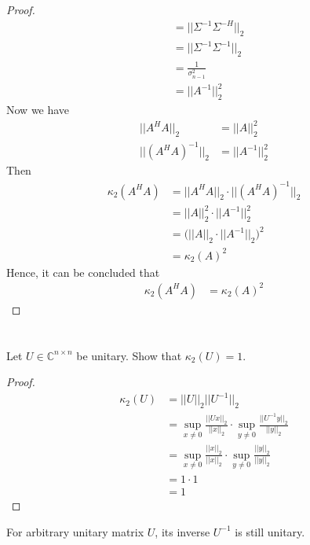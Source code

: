\documentclass[11pt,a4paper]{article}
\begin{document}
\begin{proof}
\begin{align}
     &=  || \Sigma^{-1} \Sigma^{-H} ||_2 \\
     &=  || \Sigma^{-1} \Sigma^{-1} ||_2 \\
     &=  \frac{1}{\sigma_{n-1}^2} \\
     &= || A^{-1} ||_2^2
    \end{align}   
    Now we have 
    \begin{align}
        || A^H A ||_2 &= || A ||_2^2 \\
     || (A^H A)^{-1} ||_2 &= || A^{-1} ||_2^2
    \end{align}
    Then
    \begin{align}
        \kappa_2 (A^H A) &= || A^H A ||_2 \cdot || (A^H A)^{-1} ||_2  \\
        & = || A ||_2^2 \cdot || A^{-1} ||_2^2 \\
        & = \big( || A ||_2 \cdot || A^{-1} ||_2 \big)^2 \\
        & = \kappa_2(A)^2
    \end{align}
    Hence, it can be concluded that 
    \begin{align}
        \kappa_2 (A^H A) & = \kappa_2(A)^2
    \end{align}
\end{proof}

\newpage
\section{}

\newpage
\section{}

Let $U \in \mathbb{C}^{n\times n}$ be unitary. Show that $\kappa_2(U) = 1$.
\begin{proof}
    \begin{align}
        \kappa_2 (U) &= || U ||_2 || U^{-1} ||_2  \\
        & = \sup_{x\not = 0} \frac{|| U x ||_2}{|| x ||_2} \cdot
        \sup_{y\not = 0} \frac{|| U^{-1} y ||_2}{|| y ||_2} \\
        & = \sup_{x\not = 0} \frac{|| x ||_2}{|| x ||_2} \cdot
        \sup_{y\not = 0} \frac{|| y ||_2}{|| y ||_2} \\
        & = 1 \cdot 1 \\
        & = 1
    \end{align}
\end{proof}

\begin{lemma}
    For arbitrary unitary matrix $U$, its inverse $U^{-1}$ is still unitary. 
\end{lemma}
\end{document}
